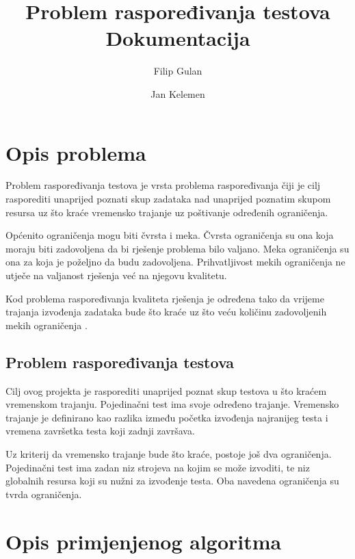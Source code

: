\documentclass[utf8, seminar, numeric]{fer}
\begin{document}
\nocite{*}

\title{Problem raspoređivanja testova \\ \large{Dokumentacija}}

\author{Filip Gulan \and Jan Kelemen}

\maketitle

\tableofcontents

\chapter{Opis problema}
Problem raspoređivanja testova je vrsta problema raspoređivanja čiji je cilj rasporediti unaprijed poznati skup zadataka nad unaprijed poznatim skupom resursa uz što kraće vremensko trajanje uz poštivanje određenih ograničenja. 

Općenito ograničenja mogu biti čvrsta i meka. Čvrsta ograničenja su ona koja moraju biti zadovoljena da bi rješenje problema bilo valjano. Meka ograničenja su ona za koja je poželjno da budu zadovoljena. Prihvatljivost mekih ograničenja ne utječe na valjanost rješenja već na njegovu kvalitetu.

Kod problema raspoređivanja kvaliteta rješenja je određena tako da vrijeme trajanja izvođenja zadataka bude što kraće uz što veću količinu zadovoljenih mekih ograničenja \cite{cupicm}.

\section{Problem raspoređivanja testova}

Cilj ovog projekta je rasporediti unaprijed poznat skup testova u što kraćem vremenskom trajanju. Pojedinačni test ima svoje određeno trajanje. Vremensko trajanje je definirano kao razlika između početka izvođenja najranijeg testa i vremena završetka testa koji zadnji završava.

Uz kriterij da vremensko trajanje bude što kraće, postoje još dva ograničenja.
Pojedinačni test ima zadan niz strojeva na kojim se može izvoditi, te niz globalnih resursa koji su nužni za izvođenje testa. Oba navedena ograničenja su tvrda ograničenja.

\chapter{Opis primjenjenog algoritma}
\end{document}
